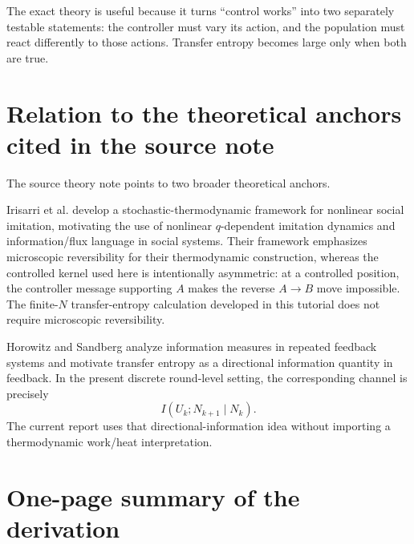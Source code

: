 \documentclass[11pt,a4paper]{article}
\newcommand{\1}{\mathbbm{1}}
\begin{document}
\begin{intuitionbox}
The exact theory is useful because it turns ``control works'' into two separately testable statements: the controller must vary its action, and the population must react differently to those actions. Transfer entropy becomes large only when both are true.
\end{intuitionbox}

\section{Relation to the theoretical anchors cited in the source note}

The source theory note points to two broader theoretical anchors.

Irisarri et al. develop a stochastic-thermodynamic framework for nonlinear social imitation, motivating the use of nonlinear $q$-dependent imitation dynamics and information/flux language in social systems. Their framework emphasizes microscopic reversibility for their thermodynamic construction, whereas the controlled kernel used here is intentionally asymmetric: at a controlled position, the controller message supporting $A$ makes the reverse $A\to B$ move impossible. The finite-$N$ transfer-entropy calculation developed in this tutorial does not require microscopic reversibility.

Horowitz and Sandberg analyze information measures in repeated feedback systems and motivate transfer entropy as a directional information quantity in feedback. In the present discrete round-level setting, the corresponding channel is precisely
\[
I(U_k;N_{k+1}\mid N_k).
\]
The current report uses that directional-information idea without importing a thermodynamic work/heat interpretation.

\section{One-page summary of the derivation}
\end{document}
